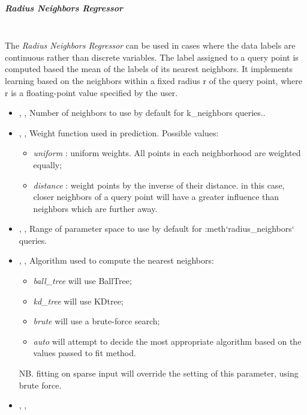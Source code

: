 \subparagraph{Radius Neighbors Regressor}
\mbox{}
\\The \textit{Radius Neighbors Regressor} can be used in cases where the data
labels are continuous rather than discrete variables.
%
The label assigned to a query point is computed based the mean of the labels of
its nearest neighbors.
%
It implements learning based on the neighbors within a fixed radius r of the
query point, where r is a floating-point value specified by the user.
%
\begin{itemize}
  \item {}, ,
  Number of neighbors to use by default for k\_neighbors queries..
  \item {}, ,
  Weight function used in prediction.
  Possible values:
\begin{itemize}
    \item \textit{uniform} : uniform weights.
    All points in each neighborhood are weighted equally;
    \item \textit{distance} : weight points by the inverse of their distance.
    in this case, closer neighbors of a query point will have a greater
    influence than neighbors which are further away.
\end{itemize}
  \item {}, ,
  Range of parameter space to use by default for :meth`radius\_neighbors`
  queries.
  \item {}, ,
  Algorithm used to compute the nearest neighbors:
\begin{itemize}
    \item \textit{ball\_tree} will use BallTree;
    \item \textit{kd\_tree} will use KDtree;
    \item \textit{brute} will use a brute-force search;
    \item \textit{auto} will attempt to decide the most appropriate algorithm
    based on the values passed to fit method.
\end{itemize}
  NB.
  fitting on sparse input will override the setting of this parameter, using
  brute force.
  \item {}, ,

\end{itemize}
